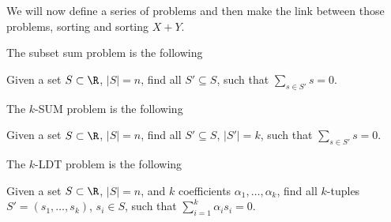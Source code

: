 We will now define a series of problems and then make the link between those
problems, sorting and sorting $X + Y$.

The subset sum problem is the following

\begin{problem}
Given a set $S \subset \R$, $\left\vert{S}\right\vert = n$, find all
$S' \subseteq S$, such that $\sum\limits_{s \in S'} s = 0$.
\end{problem}


The $k$-SUM problem is the following

\begin{problem}
Given a set $S \subset \R$, $\left\vert{S}\right\vert = n$, find all
$S' \subseteq S$, $\left\vert{S'}\right\vert = k$, such that $\sum\limits_{s
\in S'} s = 0$.
\end{problem}


The $k$-LDT problem is the following

\begin{problem}
Given a set $S \subset \R$, $\left\vert{S}\right\vert = n$, and $k$
coefficients $\alpha_1, \dots, \alpha_k$, find all $k$-tuples
$S' = (s_1, \dots, s_k)$, $s_i \in S$, such that
$\sum_{i=1}^{k} \alpha_i s_i = 0$.
\end{problem}

